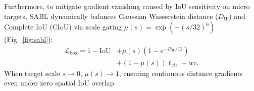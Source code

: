 Furthermore, to mitigate gradient vanishing caused by IoU sensitivity on micro targets, SABL dynamically balances Gaussian Wasserstein distance ($D_W$) and Complete IoU (CIoU) via scale gating $\mu(s) = \exp(-(s/32)^6)$ (Fig.~\ref{fig:sabl}):
\begin{equation}
\begin{aligned}
\mathcal{L}_{\mathrm{box}} = 1 - \mathrm{IoU} &+ \mu(s)\!\left(1 - e^{-D_W / 12}\right) \\
&+ (1 - \mu(s))\ell_{\mathrm{ctr}} + \alpha v.
\end{aligned}
\label{eq:sabl_loss}
\end{equation}
When target scale $s \to 0$, $\mu(s) \to 1$, ensuring continuous distance gradients even under zero spatial IoU overlap.
